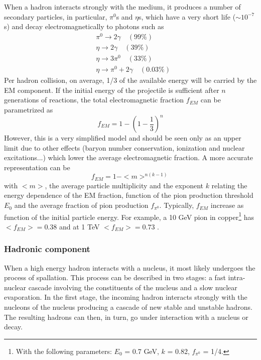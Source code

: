 When a hadron interacts strongly with the medium, it produces a number of secondary particles, in particular, $\pi^0$s and $\eta$s, which have a very short life ($\sim 10^{-7}$s) and decay electromagnetically to photons such as
\begin{equation*}
  \begin{aligned}
    &\pi^0 \rightarrow 2\gamma \quad (99\%)\\
    &\eta \rightarrow 2\gamma \quad (39\%)\\
    &\eta \rightarrow 3\pi^0 \quad (33\%)\\
    &\eta \rightarrow \pi^0 + 2\gamma \quad (0.03\%)
  \end{aligned}
\end{equation*}
Per hadron collision, on average, 1/3 of the available energy will be carried by the EM component. If the initial energy of the projectile is sufficient after $n$ generations of reactions, the total electromagnetic fraction $f_{EM}$ can be parametrized as \cite{Wigmans:392793}
\begin{equation}
  f_{EM} = 1 - (1 - \frac{1}{3})^n
\end{equation}
However, this is a very simplified model and should be seen only as an upper limit due to other effects (baryon number conservation, ionization and nuclear excitations...) which lower the average electromagnetic fraction. A more accurate representation can be \cite{Wigmans:392793}
\begin{equation}
  f_{EM} = 1 - <m>^{n(k-1)}
\end{equation}
with $<m>$, the average particle multiplicity and the exponent $k$ relating the energy dependence of the EM fraction, function of the pion production threshold $E_0$ and the average fraction of pion production $f_{\pi^0}$. Typically, $f_{EM}$ increase as function of the initial particle energy. For example, a 10 GeV pion in copper\footnote{With the following parameters: $E_0$ = 0.7 GeV, $k$ = 0.82, $f_{\pi^0}$ = 1/4.} has $<f_{EM}> = 0.38$ and at 1 TeV $<f_{EM}> = 0.73$ \cite{Wigmans:392793}.

\subsubsection{Hadronic component}
\label{subsubsec:HadComp}

When a high energy hadron interacts with a nucleus, it most likely undergoes the process of spallation. This process can be described in two stages: a fast intra-nuclear cascade involving the constituents of the nucleus and a slow nuclear evaporation. In the first stage, the incoming hadron interacts strongly with the nucleons of the nucleus producing a cascade of new stable and unstable hadrons. The resulting hadrons can then, in turn, go under interaction with a nucleus or decay.

